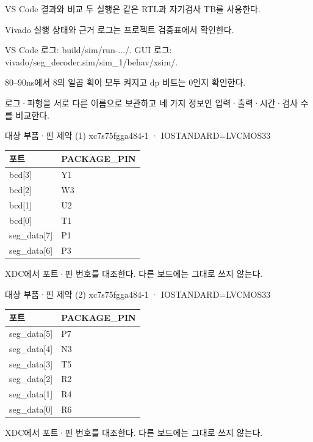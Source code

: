 \begin{frame}{VS Code 결과와 비교}\relax
\small
두 실행은 같은 RTL과 자기검사 TB를 사용한다.\par\vspace{0.22cm}Vivado 실행 상태와 근거 로그는 프로젝트 검증표에서 확인한다.\par\vspace{0.22cm}VS Code 로그: build/sim/run-.../. GUI 로그: vivado/seg\_decoder.sim/sim\_1/behav/xsim/.\par\vspace{0.22cm}80–90ns에서 8의 일곱 획이 모두 켜지고 dp 비트는 0인지 확인한다.\par\vspace{0.22cm}로그·파형을 서로 다른 이름으로 보관하고 네 가지 정보인 입력·출력·시간·검사 수를 비교한다.\par
\end{frame}

\begin{frame}{대상 부품·핀 제약 (1)}\relax
\small
xc7s75fgga484-1 · IOSTANDARD=LVCMOS33\par\begin{center}\renewcommand{\arraystretch}{1.45}
\begin{tabular}{l|l}
포트 & PACKAGE\_PIN\\\hline
bcd[3] & Y1\\
bcd[2] & W3\\
bcd[1] & U2\\
bcd[0] & T1\\
seg\_data[7] & P1\\
seg\_data[6] & P3\\
\end{tabular}\end{center}
XDC에서 포트·핀 번호를 대조한다. 다른 보드에는 그대로 쓰지 않는다.\par
\end{frame}

\begin{frame}{대상 부품·핀 제약 (2)}\relax
\small
xc7s75fgga484-1 · IOSTANDARD=LVCMOS33\par\begin{center}\renewcommand{\arraystretch}{1.45}
\begin{tabular}{l|l}
포트 & PACKAGE\_PIN\\\hline
seg\_data[5] & P7\\
seg\_data[4] & N3\\
seg\_data[3] & T5\\
seg\_data[2] & R2\\
seg\_data[1] & R4\\
seg\_data[0] & R6\\
\end{tabular}\end{center}
XDC에서 포트·핀 번호를 대조한다. 다른 보드에는 그대로 쓰지 않는다.\par
\end{frame}

